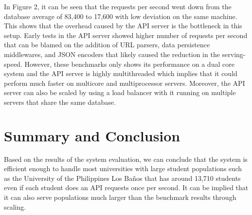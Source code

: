 \documentclass{sigchi}
\begin{document}
In Figure 2, it can be seen that the requests per second went down from the database average of 83,400 to 17,600 with low deviation on the same machine. This shows that the overhead caused by the API server is the bottleneck in this setup. Early tests in the API server showed higher number of requests per second that can be blamed on the addition of URL parsers, data persistence middlewares, and JSON encoders that likely caused the reduction in the serving-speed. However, these benchmarks only shows its performance on a dual core system and the API server is highly multithreaded which implies that it could perform much faster on multicore and multiprocessor servers. Moreover, the API server can also be scaled by using a load balancer with it running on multiple servers that share the same database. 

\section{Summary and Conclusion}

Based on the results of the system evaluation, we can conclude that the system is efficient enough to handle most universities with large student populations such as the University of the Philippines Los Baños that has around 13,710 students even if each student does an API requests once per second. It can be implied that it can also serve populations much larger than the benchmark results through scaling. 



\end{document}

